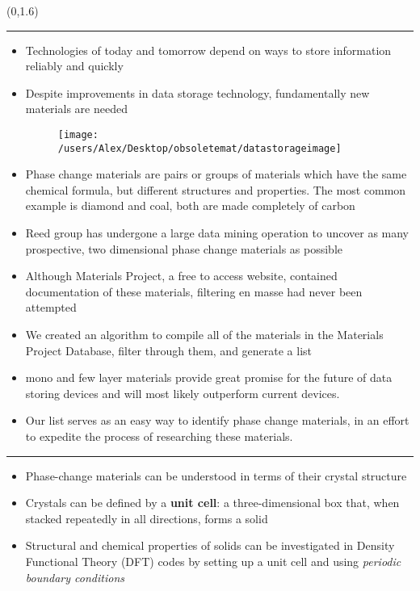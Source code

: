 \documentclass[a0]{a0poster}
\def\Head#1{\noindent{\LARGE\color{black} #1}\bigskip}
\begin{document}
\begin{textblock}{7.0}(0,1.6)
\hrule\medskip
\Head{Introduction}
\vspace{-0.1in}
\begin{itemize}
\item Technologies of today and tomorrow depend on ways to store
  information reliably and quickly
\item Despite improvements in data storage technology, fundamentally new
  materials are needed

  \begin{figure}[!ht]\centering
    \texttt{[image: /users/Alex/Desktop/obsoletemat/datastorageimage]}
  \end{figure}

\item Phase change materials are pairs or groups of materials which have the same chemical formula,
  but different structures and properties. The most common example is diamond and coal, both are made completely of carbon
\item Reed group has undergone a large data mining operation to uncover as
  many prospective, two dimensional phase change materials as possible
\item Although Materials Project, a free to access website, contained documentation of
  these materials, filtering en masse had never been attempted
\item We created an algorithm to compile all of the materials in the Materials Project
  Database, filter through them, and generate a list
\item mono and few layer materials provide great promise for the future of data storing devices
  and will most likely outperform current devices.
\item Our list serves as an easy way to identify phase change materials, in an effort to
  expedite the process of researching these materials.
\end{itemize}

\medskip
\hrule\medskip
\Head{Background}
\vspace{-0.1in}
\begin{itemize}
\item Phase-change materials can be understood in terms of
  their crystal structure
\item Crystals can be defined by a \textbf{unit cell}: a
  three-dimensional box that, when stacked repeatedly in all
  directions, forms a solid
\item Structural and chemical properties of solids can be investigated
  in Density Functional Theory (DFT) codes by setting up a unit cell
  and using \emph{periodic boundary conditions}


\end{itemize}
\end{textblock}
\end{document}
